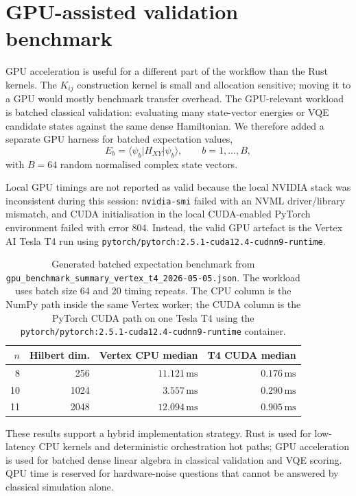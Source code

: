 \documentclass[preprint,aps,physrev,superscriptaddress,floatfix,longbibliography]{revtex4-2}
\begin{document}
\section{GPU-assisted validation benchmark}

GPU acceleration is useful for a different part of the workflow than the
Rust kernels. The $K_{ij}$ construction kernel is small and allocation
sensitive; moving it to a GPU would mostly benchmark transfer overhead.
The GPU-relevant workload is batched classical validation: evaluating
many state-vector energies or VQE candidate states against the same
dense Hamiltonian. We therefore added a separate GPU harness for batched
expectation values,
\begin{equation}
  E_b = \langle \psi_b | H_{XY} | \psi_b \rangle,
  \qquad b=1,\ldots,B,
\end{equation}
with $B=64$ random normalised complex state vectors.

Local GPU timings are not reported as valid because the local NVIDIA
stack was inconsistent during this session: \texttt{nvidia-smi} failed
with an NVML driver/library mismatch, and CUDA initialisation in the
local CUDA-enabled PyTorch environment failed with error 804. Instead,
the valid GPU artefact is the Vertex AI Tesla T4 run using
\texttt{pytorch/pytorch:2.5.1-cuda12.4-cudnn9-runtime}.

\begin{table}[tb]
\centering
\small
\begin{tabular}{rrrr}
\toprule
$n$ & Hilbert dim. & Vertex CPU median & T4 CUDA median \\
\midrule
8 & 256 & $11.121\,\mathrm{ms}$ & $0.176\,\mathrm{ms}$ \\
10 & 1024 & $3.557\,\mathrm{ms}$ & $0.290\,\mathrm{ms}$ \\
11 & 2048 & $12.094\,\mathrm{ms}$ & $0.905\,\mathrm{ms}$ \\
\bottomrule
\end{tabular}
\caption{Generated batched expectation benchmark from
\texttt{gpu\_benchmark\_summary\_vertex\_t4\_2026-05-05.json}. The
workload uses batch size 64 and 20 timing repeats. The CPU column is the
NumPy path inside the same Vertex worker; the CUDA column is the PyTorch
CUDA path on one Tesla T4 using the
\texttt{pytorch/pytorch:2.5.1-cuda12.4-cudnn9-runtime} container.}
\label{tab:gpu}
\end{table}

These results support a hybrid implementation strategy. Rust is used for
low-latency CPU kernels and deterministic orchestration hot paths; GPU
acceleration is used for batched dense linear algebra in classical
validation and VQE scoring. QPU time is reserved for hardware-noise
questions that cannot be answered by classical simulation alone.
\end{document}
